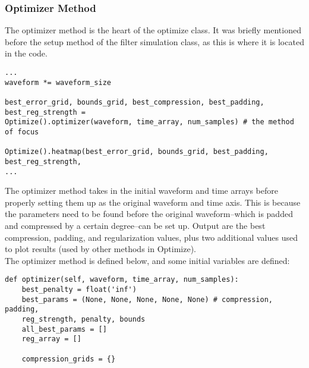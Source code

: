 \subsubsection{Optimizer Method}

The optimizer method is the heart of the optimize class. It was briefly mentioned before the setup method of the filter simulation class, as this is where it is located in the code.

\begin{verbatim}
...
waveform *= waveform_size

best_error_grid, bounds_grid, best_compression, best_padding, best_reg_strength = 
Optimize().optimizer(waveform, time_array, num_samples) # the method of focus
    
Optimize().heatmap(best_error_grid, bounds_grid, best_padding, best_reg_strength, 
...
\end{verbatim}

The optimizer method takes in the initial waveform and time arrays before properly setting them up as the original waveform and time axis. This is because the parameters need to be found before the original waveform--which is padded and compressed by a certain degree--can be set up. Output are the best compression, padding, and regularization values, plus two additional values used to plot results (used by other methods in Optimize).
\\
The optimizer method is defined below, and some initial variables are defined:

\begin{verbatim}
def optimizer(self, waveform, time_array, num_samples):
    best_penalty = float('inf')
    best_params = (None, None, None, None, None) # compression, padding, 
    reg_strength, penalty, bounds
    all_best_params = []
    reg_array = []

    compression_grids = {}
\end{verbatim}


